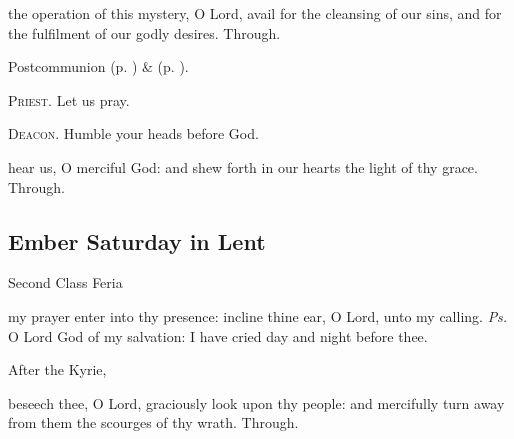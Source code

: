 \postcommunion
{} the operation of this mystery, O Lord, avail for the cleansing of our sins, and for the fulfilment of our godly desires. Through.


\begin{rubric}
     Postcommunion  (p. \pageref{AshWednesdayMassPostcommunion}) \&   (p. \pageref{SPLivingDeparted}).
\end{rubric}

\textsc{Priest.} Let us pray.\par
\textsc{Deacon.} Humble your heads before God.\par
{} hear us, O merciful God: and shew forth in our hearts the light of thy grace. Through.



\subsection{Ember Saturday in Lent}
\begin{inhead}
{Second Class Feria}
\end{inhead}


\introit
{} my prayer enter into thy presence: incline thine ear, O Lord, unto my calling. \textit{Ps.} O Lord God of my salvation: I have cried day and night before thee.
\begin{rubric}
    After the Kyrie,
\end{rubric}

\collect
{} beseech thee, O Lord, graciously look upon thy people: and mercifully turn away from them the scourges of thy wrath. Through.


